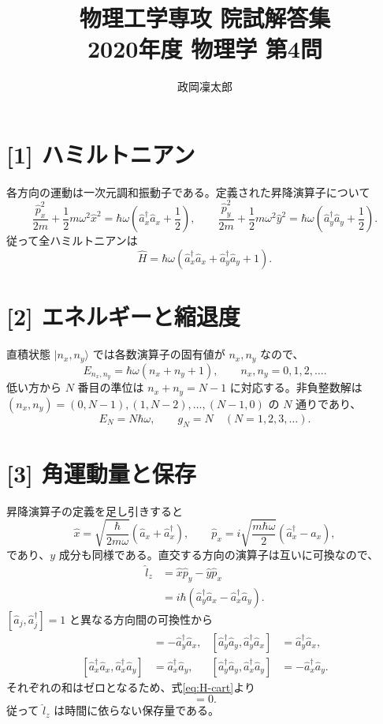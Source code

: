 \documentclass[11pt,a4paper]{article}
\title{物理工学専攻 院試解答集\\2020年度 物理学 第4問}
\author{政岡凜太郎}
\date{}
\begin{document}
\maketitle

\section*{[1] ハミルトニアン}
各方向の運動は一次元調和振動子である。定義された昇降演算子について
\[
 \frac{\hat p_x^2}{2m}+\frac12m\omega^2\hat x^2
 =\hbar\omega\left(\hat a_x^\dagger\hat a_x+\frac12\right),
 \qquad
 \frac{\hat p_y^2}{2m}+\frac12m\omega^2\hat y^2
 =\hbar\omega\left(\hat a_y^\dagger\hat a_y+\frac12\right).
\]
従って全ハミルトニアンは
\begin{equation}
 \hat H=\hbar\omega\left(\hat a_x^\dagger\hat a_x+
                         \hat a_y^\dagger\hat a_y+1\right).
 \label{eq:H-cart}
\end{equation}

\section*{[2] エネルギーと縮退度}
直積状態 $|n_x,n_y\rangle$ では各数演算子の固有値が $n_x,n_y$ なので、
\begin{equation}
 E_{n_x,n_y}=\hbar\omega(n_x+n_y+1),\qquad n_x,n_y=0,1,2,\ldots.
 \label{eq:E-cart}
\end{equation}
低い方から $N$ 番目の準位は $n_x+n_y=N-1$ に対応する。非負整数解は
$(n_x,n_y)=(0,N-1),(1,N-2),\ldots,(N-1,0)$ の $N$ 通りであり、
\begin{equation}
 E_N=N\hbar\omega,\qquad g_N=N\quad(N=1,2,3,\ldots).
\end{equation}

\section*{[3] 角運動量と保存}
昇降演算子の定義を足し引きすると
\[
 \hat x=\sqrt{\frac{\hbar}{2m\omega}}(\hat a_x+\hat a_x^\dagger),
 \qquad
 \hat p_x=i\sqrt{\frac{m\hbar\omega}{2}}
                   (\hat a_x^\dagger-\hat a_x),
\]
であり、$y$ 成分も同様である。直交する方向の演算子は互いに可換なので、
\begin{align}
 \hat l_z&=\hat x\hat p_y-\hat y\hat p_x\\
 &=i\hbar(\hat a_y^\dagger\hat a_x-
                   \hat a_x^\dagger\hat a_y).
 \label{eq:l-cart}
\end{align}
$[\hat a_j,\hat a_j^\dagger]=1$ と異なる方向間の可換性から
\begin{align}
 [\hat a_x^\dagger\hat a_x,\hat a_y^\dagger\hat a_x]&=-\hat a_y^\dagger\hat a_x,
 & [\hat a_y^\dagger\hat a_y,\hat a_y^\dagger\hat a_x]&=\hat a_y^\dagger\hat a_x,\\
 [\hat a_x^\dagger\hat a_x,\hat a_x^\dagger\hat a_y]&=\hat a_x^\dagger\hat a_y,
 & [\hat a_y^\dagger\hat a_y,\hat a_x^\dagger\hat a_y]&=-\hat a_x^\dagger\hat a_y.
\end{align}
それぞれの和はゼロとなるため、式\eqref{eq:H-cart}より
\begin{equation}
 [\hat H,\hat l_z]=0.
\end{equation}
従って $\hat l_z$ は時間に依らない保存量である。
\end{document}
